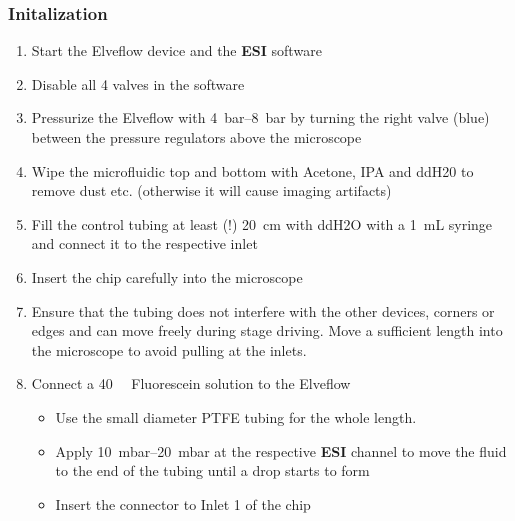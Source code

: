 \documentclass{article}
\begin{document}
	\subsubsection{Initalization}
	\begin{enumerate}
	\item Start the Elveflow device and the \textbf{ESI} software
	\item Disable all 4 valves in the software
	\item Pressurize the Elveflow with \SIrange{4}{8}{\bar} by turning the right valve (blue) between the pressure regulators above the microscope
	\item Wipe the microfluidic top and bottom with Acetone, IPA and ddH20 to remove dust etc. (otherwise it will cause imaging artifacts)
	\item 	Fill the control tubing at least (!) \SI{20}{\centi\meter} with ddH2O with a \SI{1}{\milli\liter} syringe and connect it to the respective inlet
	\item 	Insert the chip carefully into the microscope
	\item 	Ensure that the tubing does not interfere with the other devices, corners or edges and can move freely during stage driving. Move a sufficient length into the microscope to avoid pulling at the inlets.
	\item Connect a \SI{40}{\micro\molar} Fluorescein solution to the Elveflow
	\begin{itemize}
		\item Use the small diameter PTFE tubing for the whole length.
		\item Apply \SIrange{10}{20}{\milli\bar} at the respective \textbf{ESI} channel to move the fluid to the end of the tubing until a drop starts to form
		\item  Insert the connector to Inlet 1 of the chip
	\end{itemize}


\end{enumerate}
\end{document}
